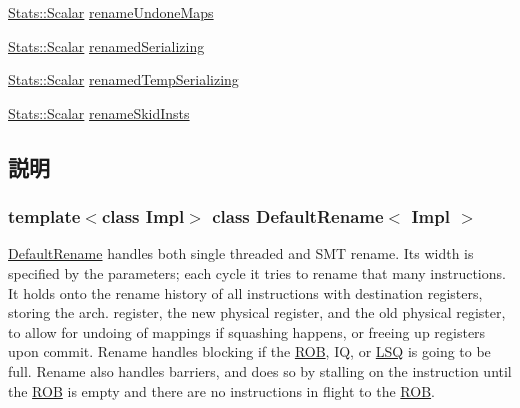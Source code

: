 \begin{DoxyCompactItemize}
\item 
\hyperlink{classStats_1_1Scalar}{Stats::Scalar} \hyperlink{classDefaultRename_ae0c8395975c577671916d55df6e05b16}{renameUndoneMaps}
\item 
\hyperlink{classStats_1_1Scalar}{Stats::Scalar} \hyperlink{classDefaultRename_a6e383a41c8a2b8902dd659805c40621e}{renamedSerializing}
\item 
\hyperlink{classStats_1_1Scalar}{Stats::Scalar} \hyperlink{classDefaultRename_a94f16020be7d9c91aa978ce88f0adb1b}{renamedTempSerializing}
\item 
\hyperlink{classStats_1_1Scalar}{Stats::Scalar} \hyperlink{classDefaultRename_a50c910ed2a23d1bbb3e7861c2d1f33f4}{renameSkidInsts}
\end{DoxyCompactItemize}


\subsection{説明}
\subsubsection*{template$<$class Impl$>$ class DefaultRename$<$ Impl $>$}

\hyperlink{classDefaultRename}{DefaultRename} handles both single threaded and SMT rename. Its width is specified by the parameters; each cycle it tries to rename that many instructions. It holds onto the rename history of all instructions with destination registers, storing the arch. register, the new physical register, and the old physical register, to allow for undoing of mappings if squashing happens, or freeing up registers upon commit. Rename handles blocking if the \hyperlink{classROB}{ROB}, IQ, or \hyperlink{classLSQ}{LSQ} is going to be full. Rename also handles barriers, and does so by stalling on the instruction until the \hyperlink{classROB}{ROB} is empty and there are no instructions in flight to the \hyperlink{classROB}{ROB}. 

